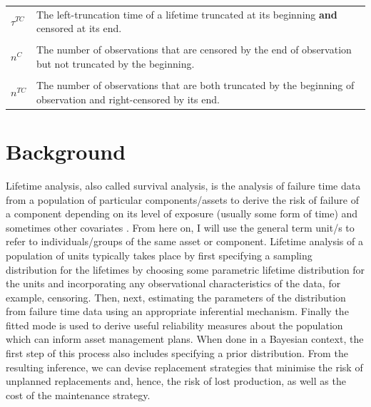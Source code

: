 \begin{table}
\begin{tabularx}{\textwidth}{lY}
    $\tau^{TC}$ & The left-truncation time of a lifetime truncated at its beginning \textbf{and} censored at its end.\\
     & \\
    $n^C$ & The number of observations that are censored by the end of observation but not truncated by the beginning.\\
     & \\
    $n^{TC}$ & The number of observations that are both truncated by the beginning of observation and right-censored by its end.\\

    \bottomrule
    \end{tabularx}
\end{table}
    

\section{Background} \label{sec:lifetime-data-background}

Lifetime analysis, also called survival analysis, is the analysis of failure time data from a population of particular components/assets to derive the risk of failure of a component depending on its level of exposure (usually some form of time) and sometimes other covariates \citep{moore2016}. From here on, I will use the general term unit/s to refer to individuals/groups of the same asset or component. Lifetime analysis of a population of units typically takes place by first specifying a sampling distribution for the lifetimes by choosing some parametric lifetime distribution for the units and incorporating any observational characteristics of the data, for example, censoring. Then, next, estimating the parameters of the distribution from failure time data using an appropriate inferential mechanism. Finally the fitted mode is used to derive useful reliability measures about the population which can inform asset management plans. When done in a Bayesian context, the first step of this process also includes specifying a prior distribution. From the resulting inference, we can devise replacement strategies that minimise the risk of unplanned replacements and, hence, the risk of lost production, as well as the cost of the maintenance strategy.

